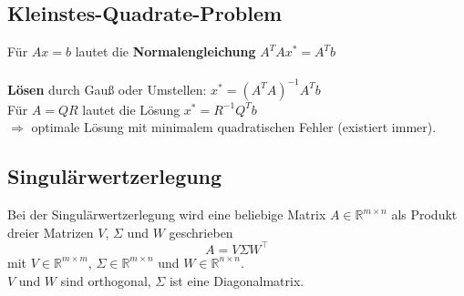 \documentclass[6pt,a4paper]{scrartcl}
\begin{document}
\begin{multicols*}{4}
\subsection{Kleinstes-Quadrate-Problem}
Für $Ax = b$ lautet die
\textbf{Normalengleichung}
$A^TAx^* = A^Tb$\\
\\
\textbf{Lösen} durch Gauß oder Umstellen: $x^* = (A^TA)^{-1}A^Tb$\\
Für  $A=QR$ lautet die Lösung $x^* = R^{-1}Q^Tb$\\
$\Rightarrow$ optimale Lösung mit minimalem quadratischen Fehler (existiert immer).

\subsection{Singulärwertzerlegung}
Bei der Singulärwertzerlegung wird eine beliebige Matrix $A\in \mathbb{R}^{m\times n}$ als Produkt dreier Matrizen $V$, $\Sigma$ und $W$ geschrieben
\begin{equation*}
A=V\Sigma W^\top
\end{equation*}
mit $V\in \mathbb{R}^{m\times m}$, $\Sigma\in \mathbb{R}^{m\times n}$ und $W\in \mathbb{R}^{n\times n}$.\\
$V$ und $W$ sind orthogonal, $\Sigma$ ist eine Diagonalmatrix.

\end{multicols*}
\end{document}
